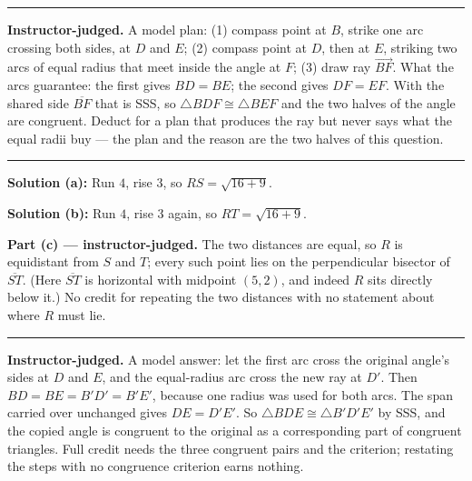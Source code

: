\documentclass[12pt]{article}
\begin{document}
\vspace{0.15cm}
\noindent\rule{\linewidth}{0.2pt}


\textbf{Instructor-judged.} A model plan: (1) compass point at $B$, strike one
arc crossing both sides, at $D$ and $E$; (2) compass point at $D$, then at $E$,
striking two arcs of equal radius that meet inside the angle at $F$; (3) draw
ray $\overrightarrow{BF}$. What the arcs guarantee: the first gives $BD = BE$;
the second gives $DF = EF$. With the shared side $\overline{BF}$ that is SSS,
so $\triangle BDF \cong \triangle BEF$ and the two halves of the angle are
congruent. Deduct for a plan that produces the ray but never says what the equal
radii buy --- the plan and the reason are the two halves of this question.

\vspace{0.15cm}
\noindent\rule{\linewidth}{0.2pt}


\textbf{Solution (a):} Run $4$, rise $3$, so $RS = \sqrt{16 + 9}$. 

\textbf{Solution (b):} Run $4$, rise $3$ again, so $RT = \sqrt{16 + 9}$. 

\textbf{Part (c) --- instructor-judged.} The two distances are equal, so $R$ is
equidistant from $S$ and $T$; every such point lies on the perpendicular
bisector of $\overline{ST}$. (Here $\overline{ST}$ is horizontal with midpoint
$(5, 2)$, and indeed $R$ sits directly below it.) No credit for repeating the
two distances with no statement about where $R$ must lie.

\vspace{0.15cm}
\noindent\rule{\linewidth}{0.2pt}


\textbf{Instructor-judged.} A model answer: let the first arc cross the original
angle's sides at $D$ and $E$, and the equal-radius arc cross the new ray at
$D'$. Then $BD = BE = B'D' = B'E'$, because one radius was used for both arcs.
The span carried over unchanged gives $DE = D'E'$. So
$\triangle BDE \cong \triangle B'D'E'$ by SSS, and the copied angle is congruent
to the original as a corresponding part of congruent triangles. Full credit
needs the three congruent pairs and the criterion; restating the steps with no
congruence criterion earns nothing.
\end{document}
